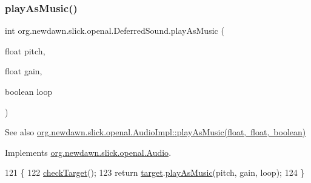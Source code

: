 \mbox{\label{classorg_1_1newdawn_1_1slick_1_1openal_1_1_deferred_sound_a45f8b32fe216cc2430b16a10f1104aab}} 
\subsubsection{\texorpdfstring{play\+As\+Music()}{playAsMusic()}}
{\footnotesize\ttfamily int org.\+newdawn.\+slick.\+openal.\+Deferred\+Sound.\+play\+As\+Music (\begin{DoxyParamCaption}\item[{float}]{pitch,  }\item[{float}]{gain,  }\item[{boolean}]{loop }\end{DoxyParamCaption})\hspace{0.3cm}{\ttfamily [inline]}}

\begin{DoxySeeAlso}{See also}
\mbox{\hyperlink{classorg_1_1newdawn_1_1slick_1_1openal_1_1_audio_impl_ac8b7973bc209b0a2ecfc169b1d9eaae4}{org.\+newdawn.\+slick.\+openal.\+Audio\+Impl\+::play\+As\+Music(float, float, boolean)}} 
\end{DoxySeeAlso}


Implements \mbox{\hyperlink{interfaceorg_1_1newdawn_1_1slick_1_1openal_1_1_audio_a9a13784b5ec9ce06c8756f98b00e05ab}{org.\+newdawn.\+slick.\+openal.\+Audio}}.


\begin{DoxyCode}
121                                                                   \{
122         \mbox{\hyperlink{classorg_1_1newdawn_1_1slick_1_1openal_1_1_deferred_sound_a63fc1a65a177fcaeb93ba0a071c10086}{checkTarget}}();
123         \textcolor{keywordflow}{return} \mbox{\hyperlink{classorg_1_1newdawn_1_1slick_1_1openal_1_1_deferred_sound_ab156655c2d91c0a6bbec8bd4438ac875}{target}}.\mbox{\hyperlink{interfaceorg_1_1newdawn_1_1slick_1_1openal_1_1_audio_a9a13784b5ec9ce06c8756f98b00e05ab}{playAsMusic}}(pitch, gain, loop);
124     \}
\end{DoxyCode}
\mbox{\label{classorg_1_1newdawn_1_1slick_1_1openal_1_1_deferred_sound_a190d70bc5dc152dbc8ca60a2842d02ee}} 
